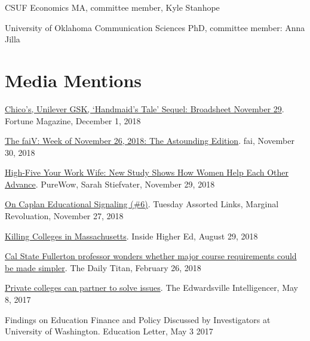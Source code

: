\documentclass[11pt,a4paper,sans]{moderncv}
\begin{document}
CSUF Economics MA, committee member, Kyle Stanhope



University of Oklahoma Communication Sciences PhD, committee member: Anna Jilla



\section{Media Mentions}  
  
\href{http://fortune.com/2018/11/29/chicos-unilever-gsk-handmaids-tale-sequel-broadsheet-november-29/?xid=gn_editorspicks}{Chico's, Unilever GSK, `Handmaid's Tale' Sequel: Broadsheet November 29}. Fortune Magazine, December 1, 2018



\href{https://mailchi.mp/financialaccess/the-faiv-week-of-nov262018}{The faiV: Week of November 26, 2018: The Astounding Edition}. fai, November 30, 2018



\href{https://www.purewow.com/news/west-point-study-on-women-helping-each-other-at-work}{High-Five Your Work Wife: New Study Shows How Women Help Each Other Advance}. PureWow, Sarah Stiefvater, November 29, 2018



\href{https://marginalrevolution.com/marginalrevolution/2018/11/tuesday-assorted-links-191.html}{On Caplan Educational Signaling (\#6)}. Tuesday Assorted Links, Marginal Revoluation, November 27, 2018



\href{https://www.insidehighered.com/views/2018/08/29/state-policy-makers-should-stop-overlooking-role-private-colleges-providing-access}{Killing Colleges in Massachusetts}. Inside Higher Ed, August 29, 2018



\href{https://dailytitan.com/2018/02/cal-state-fullerton-professor-wonders-whether-major-course-requirements-made-simpler/}{Cal State Fullerton professor wonders whether major course requirements could be made simpler}. The Daily Titan, February 26, 2018



\href{http://www.theintelligencer.com/news/article/Private-colleges-can-partner-to-solve-issues-11129681.php}{Private colleges can partner to solve issues}. The Edwardsville Intelligencer, May 8, 2017



Findings on Education Finance and Policy Discussed by Investigators at University of Washington. Education Letter, May 3 2017
\end{document}
